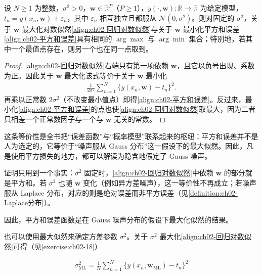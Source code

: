 \documentclass[../../main.tex]{subfiles}
\begin{document}
\begin{proposition}\label{proposition:ch02-最大似然等价平方和}
设 $N\geqslant1$ 为整数，$\sigma^{2}>0$，$\mathbf{w}\in\mathbb{R}^{P}$（$P\geqslant1$），$y(\cdot,\mathbf{w}):\mathbb{R}\to\mathbb{R}$ 为给定模型，$t_n=y(x_n,\mathbf{w})+\varepsilon_n$，其中 $\varepsilon_n$ 相互独立且都服从 $\mathcal{N}(0,\sigma^{2})$。则对固定的 $\sigma^{2}$，关于 $\mathbf{w}$ 最大化对数似然\eqref{align:ch02-回归对数似然}与关于 $\mathbf{w}$ 最小化平方和误差\eqref{align:ch02-平方和误差}具有相同的 $\arg\max$ 与 $\arg\min$ 集合；特别地，若其中一个最值点存在，则另一个也在同一点取到。
\end{proposition}

\begin{proof}
\eqref{align:ch02-回归对数似然}右端只有第一项依赖 $\mathbf{w}$，且它以负号出现、系数为正。因此关于 $\mathbf{w}$ 最大化该式等价于关于 $\mathbf{w}$ 最小化
\begin{align*}
 \frac{1}{2\sigma^{2}}\sum_{n=1}^{N}\big\{y(x_n,\mathbf{w})-t_n\big\}^{2} .
\end{align*}
再乘以正常数 $2\sigma^{2}$（不改变最小值点）即得\eqref{align:ch02-平方和误差}。反过来，最小化\eqref{align:ch02-平方和误差}的点也使\eqref{align:ch02-回归对数似然}取最大，因为二者只相差一个正常数因子与一个与 $\mathbf{w}$ 无关的常数。
\end{proof}

\begin{remark}
这条等价性是全书把“误差函数”与“概率模型”联系起来的枢纽：平方和误差并不是人为选定的，它等价于“噪声服从 Gauss 分布”这一假设下的最大似然。因此，凡是使用平方损失的地方，都可以解读为隐含地假定了 Gauss 噪声。

证明只用到一个事实：$\sigma^{2}$ 固定时，\eqref{align:ch02-回归对数似然}中依赖 $\mathbf{w}$ 的部分就是平方和。若 $\sigma^{2}$ 也随 $\mathbf{w}$ 变化（例如异方差噪声），这一等价性不再成立；若噪声服从 Laplace 分布，对应的则是绝对误差而非平方误差（见\cref{definition:ch02-Laplace分布}）。
\end{remark}

因此，平方和误差函数是在 Gauss 噪声分布的假设下最大化似然的结果。

也可以使用最大似然来确定方差参数 $\sigma^{2}$。关于 $\sigma^{2}$ 最大化\eqref{align:ch02-回归对数似然}可得（见\cref{exercise:ch02-18}）

\begin{align}
  \sigma_{\mathrm{ML}}^{2} = \frac{1}{N}\sum_{n=1}^{N}\big\{y(x_n,\mathbf{w}_{\mathrm{ML}})-t_n\big\}^{2}
  \label{align:ch02-回归方差}
\end{align}
\end{document}
